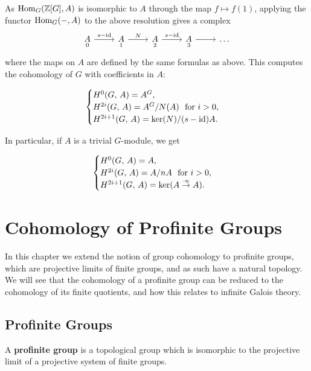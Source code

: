\documentclass[a4paper, oneside]{memoir}
\begin{document}
As $\operatorname{Hom}_G(\mathbb{Z}[G],A)$ is isomorphic to $A$ through the map $f\mapsto f(1)$, applying the functor $\operatorname{Hom}_G(-,A)$ to the above resolution gives a complex
\[
	\begin{tikzcd}
		\underset{0}{A} \arrow[r, "s-\id"] & \underset{1}{A} \arrow[r, "N"] & \underset{2}{A} \arrow[r, "s-\id"] & \underset{3}{A} \arrow[r] & \dots
	\end{tikzcd}
\]
where the maps on $A$ are defined by the same formulas as above. This computes the cohomology of $G$ with coefficients in $A$:

\begin{equation}\label{eq:CycCohom}
	\begin{cases}
		H^{0}( G, \, A )= A^G,                          \\
		H^{2i}( G, \, A ) = A^G/N(A) ~\text{ for } i>0, \\
		H^{2i+1}( G, \, A ) = \ker(N)/(s-\operatorname{id})A.
	\end{cases}
\end{equation}

In particular, if $A$ is a trivial $G$-module, we get

\begin{equation}\label{eq:CycCohomTriv}
	\begin{cases}
		H^{0}( G, \, A ) = A,                       \\
		H^{2i}( G, \, A ) = A/nA ~\text{ for } i>0, \\
		H^{2i+1}( G, \, A ) = \ker(A\overset{\cdot n}{\to} A).
	\end{cases}
\end{equation}

\chapter{Cohomology of Profinite Groups}

In this chapter we extend the notion of group cohomology to profinite groups, which are projective limits of finite groups, and as such have a natural topology. We will see that the cohomology of a profinite group can be reduced to the cohomology of its finite quotients, and how this relates to infinite Galois theory.

\section{Profinite Groups}
\begin{definition}
	A \textbf{profinite group} is a topological group which is isomorphic to the projective limit of a projective system of finite groups.
\end{definition}
\end{document}
